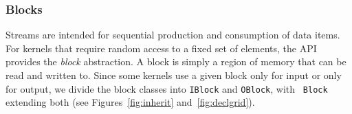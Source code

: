 






\subsubsection{Blocks}
\label{sec:blocks}

Streams are intended for sequential production and consumption of data
items.  For kernels that require random access to a fixed set of
elements, the API provides the {\it block} abstraction.  A block is
simply a region of memory that can be read and written to.  Since some
kernels use a given block only for input or only for output, we divide
the block classes into {\tt IBlock} and {\tt OBlock}, with {\tt
Block} extending both (see Figures~\ref{fig:inherit}
and~\ref{fig:declgrid}).

